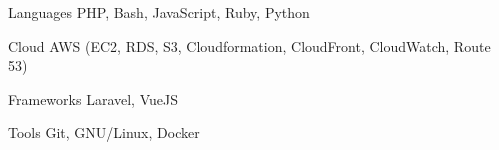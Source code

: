 
\begin{cvskills}
  \cvskill
    {Languages} %
    {PHP, Bash, JavaScript, Ruby, Python} %

  \cvskill
    {Cloud} %
    {AWS (EC2, RDS, S3, Cloudformation, CloudFront, CloudWatch, Route 53)} %

  \cvskill
    {Frameworks} %
    {Laravel, VueJS} %

  \cvskill
    {Tools} %
    {Git, GNU/Linux, Docker} %
\end{cvskills}

